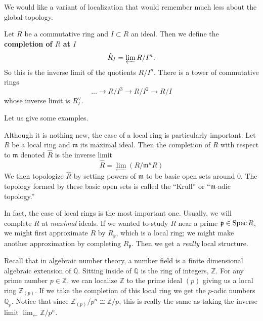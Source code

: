 We would like a variant of localization that would remember much less about the
global topology.


\begin{definition} 
Let $R$ be a commutative ring and $I \subset R$ an ideal. Then we define the
\textbf{completion of $R$ at $I$}
\[ \hat{R}_I = \varprojlim R/I^n.  \]
So this is the inverse limit of the quotients $R/I^n$. There is a tower of
commutative rings
\[ \dots \to  R/I^3 \to R/I^2 \to R/I   \]
whose inverse limit is $R^{\vee}_I$. 
\end{definition} 



Let us give some examples.
\begin{example} 
Although it is nothing new, the case of a local ring is particularly
important. Let $R$ be a local ring and $\mathfrak{m}$ its maximal ideal. Then the completion of $R$ with respect to $\mathfrak{m}$ denoted $\hat{R}$ is the inverse limit 
\begin{equation}
\hat{R}=\lim_{\leftarrow}(R/\mathfrak{m}^nR)\end{equation} We then topologize $\hat{R}$ by setting powers of $\mathfrak{m}$ to be basic open sets around $0$. The topology formed by these basic open sets is called the ``Krull'' or ``$\mathfrak{m}$-adic topology.''

In fact, the case of local rings is the most important one.
Usually, we will complete $R$ at \emph{maximal} ideals.
If we wanted to study $R$ near a prime $\mathfrak{p} \in \operatorname{Spec} R$, we might
first approximate $R$ by $R_{\mathfrak{p}}$, which is a local ring; we might
make another approximation by completing $R_{\mathfrak{p}}$. Then we get a
\emph{really} local structure. 
\end{example}

\begin{example}
Recall that in algebraic number theory, a number field is a 
finite dimensional algebraic extension of $\mathbb{Q}$. 
Sitting inside of $\mathbb{Q}$ is the ring of integers, $\mathbb{Z}$. For any prime number $p\in \mathbb{Z}$, we can localize $\mathbb{Z}$ to the 
 prime ideal $(p)$ giving us a local ring $\mathbb{Z}_(p)$. 
 If we take the completion of this local ring we get the $p$-adic numbers $\mathbb{Q}_p$. Notice that since $\mathbb{Z}_(p)/p^n\cong\mathbb{Z}/p$, this is really the same as taking the inverse limit $\lim_{\leftarrow}\mathbb{Z}/p^n$.
\end{example}

